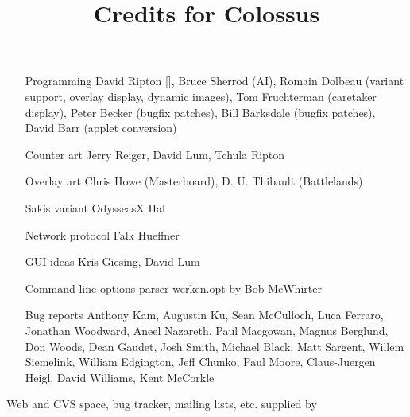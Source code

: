 \documentclass{article}
\begin{document}

\title{Credits for Colossus}

\maketitle

\begin{itemize}

\item[Programming] David Ripton [], Bruce Sherrod (AI), Romain Dolbeau (variant support, overlay display, dynamic images), Tom Fruchterman (caretaker display), Peter Becker (bugfix patches), Bill Barksdale (bugfix patches), David Barr (applet conversion)

\item[Counter art] Jerry Reiger, David Lum, Tchula Ripton

\item[Overlay art] Chris Howe (Masterboard), D. U. Thibault (Battlelands)

\item[Sakis variant] OdysseasX Hal

\item[Network protocol] Falk Hueffner

\item[GUI ideas] Kris Giesing, David Lum

\item[Command-line options parser] werken.opt by Bob McWhirter

\item[Bug reports] Anthony Kam, Augustin Ku, Sean McCulloch, Luca Ferraro, Jonathan Woodward, Aneel Nazareth, Paul Macgowan, Magnus Berglund, Don Woods, Dean Gaudet, Josh Smith, Michael Black, Matt Sargent, Willem Siemelink, William Edgington, Jeff Chunko, Paul Moore, Claus-Juergen Heigl, David Williams, Kent McCorkle

\end{itemize}

Web and CVS space, bug tracker, mailing lists, etc. supplied by 
\end{document}
